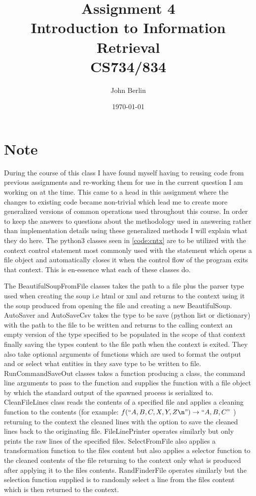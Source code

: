 \documentclass[11pt]{article}
\title{Assignment 4 \\ Introduction to Information Retrieval \\ CS734/834}
\author{John Berlin}
\date{\today}
\newcommand*{\escape}[1]{\texttt{\textbackslash#1}}
\begin{document}
\maketitle
\newpage
\section*{Note}

\indent During the course of this class I have found myself having to reusing code from previous assignments and re-working them for use in the current question I am working on at the time. This came to a head in this assignment where the changes to existing code became non-trivial which lead me to create more generalized versions of common operations used throughout this course. In order to keep the answers to questions about the methodology used in answering rather than implementation details using these generalized methods I will explain what they do here. The python3 classes seen in \autoref{code:cntx} are to be utilized with the context control statement  most commonly used with the  statement which opens a file object and automatically closes it when the control flow of the program exits that context. This is en-essence what each of these classes do. \newline   \newline  

The BeautifulSoupFromFile classes takes the path to a file plus the parser type used when creating the soup i.e html or xml and returns to the context using it the soup produced from opening the file and creating a new BeautifulSoup. AutoSaver and AutoSaveCsv takes the type to be save (python list or dictionary) with the path to the file to be written and returns to the calling context an empty version of the type specified to be populated in the scope of that context finally saving the types content to the file path when the context is exited. They also take optional arguments of functions which are used to format the output and or select what entities in they save type to be written to file. RunCommandSaveOut classes takes a function producing a  class, the command line arguments to pass to the function and supplies the function with a file object by which the standard output of the spawned process is serialized to. CleanFileLines class reads the contents of a specified file and applies a cleaning function to the contents (for example: $f(``A,B,C,X,Y,Z\escape{n}") \to ``A,B,C"$ ) returning to the context the cleaned lines with the option to save the cleaned lines back to the originating file. FileLinePrinter operates similarly but only prints the raw lines of the specified files. SelectFromFile also applies a transformation function to the files content but also applies a selector function to the cleaned contents of the file returning to the context only what is produced  after applying it to the files contents. RandFinderFile operates similarly but the selection function supplied is to randomly select a line from the files content which is then returned to the context.  \newline   \newline  
\end{document}
